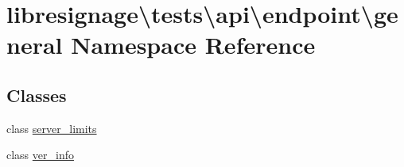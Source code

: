 \hypertarget{namespacelibresignage_1_1tests_1_1api_1_1endpoint_1_1general}{}\section{libresignage\textbackslash{}tests\textbackslash{}api\textbackslash{}endpoint\textbackslash{}general Namespace Reference}
\label{namespacelibresignage_1_1tests_1_1api_1_1endpoint_1_1general}
\subsection*{Classes}
\begin{DoxyCompactItemize}
\item 
class \hyperlink{classlibresignage_1_1tests_1_1api_1_1endpoint_1_1general_1_1server__limits}{server\+\_\+limits}
\item 
class \hyperlink{classlibresignage_1_1tests_1_1api_1_1endpoint_1_1general_1_1ver__info}{ver\+\_\+info}
\end{DoxyCompactItemize}
